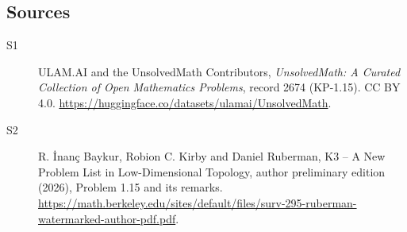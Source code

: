 \documentclass[11pt]{article}
\begin{document}
\subsection{Sources}
\begin{description}
\item[\hypertarget{source:2674:1}{S1}] ULAM.AI and the UnsolvedMath Contributors, \emph{UnsolvedMath: A Curated Collection of Open Mathematics Problems}, record 2674 (KP-1.15). CC BY 4.0. \url{https://huggingface.co/datasets/ulamai/UnsolvedMath}.
\item[\hypertarget{source:2674:2}{S2}] R. \.{I}nan\c{c} Baykur, Robion C. Kirby and Daniel Ruberman, K3 -- A New Problem List in Low-Dimensional Topology, author preliminary edition (2026), Problem 1.15 and its remarks. \url{https://math.berkeley.edu/sites/default/files/surv-295-ruberman-watermarked-author-pdf.pdf}.
\end{description}
\label{end:2674}
\end{document}
